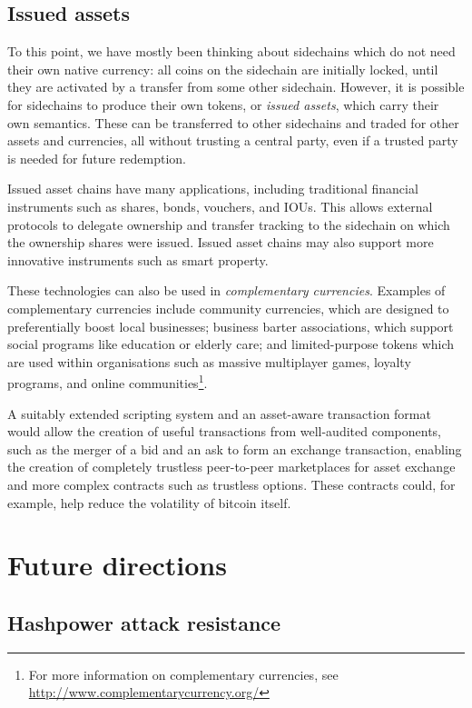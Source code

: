 \documentclass[letterpaper]{article}
\newcommand{\sidechain}{sidechain\xspace}
\newcommand{\sidechains}{sidechains\xspace}
\begin{document}
\subsection{Issued assets}

To this point, we have mostly been thinking about \sidechains which do not need
their own native currency: all coins on the \sidechain are initially locked, until
they are activated by a transfer from some other \sidechain. However, it is
possible for \sidechains to produce their own tokens, or \emph{issued assets},
which carry their own semantics. These can be transferred to other \sidechains
and traded for other assets and currencies, all without trusting a central party, even if
a trusted party is needed for future redemption.

Issued asset chains have many applications, including traditional financial instruments such
as shares, bonds, vouchers, and IOUs. This allows external protocols to delegate ownership
and transfer tracking to the \sidechain on which the ownership shares were issued. Issued
asset chains may also support more innovative instruments such as smart property.

These technologies can also be used in \emph{complementary currencies}\cite{lietaer2001}.
Examples of complementary currencies include community currencies, which are
designed to preferentially boost local businesses; business barter associations, which
support social programs like education or elderly care; and limited-purpose tokens which
are used within organisations such as massive multiplayer games, loyalty programs, and
online communities\footnote{For more information on complementary currencies, see
\url{http://www.complementarycurrency.org/}}.

 A suitably extended scripting system and an asset-aware transaction format would allow the
creation of useful transactions from well-audited components, such as the merger
of a bid and an ask to form an exchange transaction,  enabling the
creation of completely trustless peer-to-peer marketplaces for asset
exchange and more complex contracts such as trustless
options\cite{friedenbach+timon2013}. These contracts could, for example, 
help reduce the volatility of bitcoin itself.

\section{Future directions}

\subsection{Hashpower attack resistance}
\end{document}
